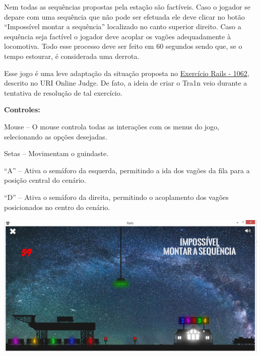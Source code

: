 \documentclass[a4paper]{article}
\begin{document}
{\color{black}
Nem todas as sequências propostas pela estação são factíveis. Caso o
jogador se depare com uma sequência que não pode ser efetuada ele deve
clicar no botão “Impossível montar a sequência” localizado no canto
superior direito. Caso a sequência seja factível o jogador deve acoplar
os vagões adequadamente à locomotiva. Todo esse processo deve ser feito
em 60 segundos sendo que, se o tempo estourar, é considerada uma
derrota.}

{\color{black}
Esse jogo é uma leve adaptação da situação proposta no
\href{https://www.urionlinejudge.com.br/judge/en/problems/view/1062}{Exercício}\href{https://www.urionlinejudge.com.br/judge/en/problems/view/1062}{
}\href{https://www.urionlinejudge.com.br/judge/en/problems/view/1062}{Rails}\href{https://www.urionlinejudge.com.br/judge/en/problems/view/1062}{
- 1062}, descrito no URI Online Judge. De fato, a ideia de criar o
Tra1n veio durante a tentativa de resolução de tal exercício.}


\bigskip

{\color{black}
\textbf{Controles:}}

{\color{black}
Mouse – O mouse controla todas as interações com os menus do jogo,
selecionando as opções desejadas.}

{\color{black}
Setas – Movimentam o guindaste.}

{\color{black}
“A” – Ativa o semáforo da esquerda, permitindo a ida dos vagões da fila
para a posição central do cenário.}

{\color{black}
“D” – Ativa o semáforo da direita, permitindo o acoplamento dos vagões
posicionados no centro do cenário.}

\begin{center}
\includegraphics[width=5.2272in,height=2.7646in]{Tra1n-img/Tra1n-img2.png}
\end{center}
\end{document}
